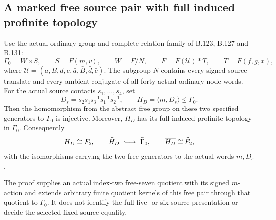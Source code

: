 \subsection*{A marked free source pair with full induced profinite topology}

\label{stmt:B132}
Use the actual ordinary group and complete relation family of B.123,
B.127 and B.131:
\[
 \Gamma_0=W\rtimes S,\qquad S=F(m,v),\qquad
 W=F/N,\qquad F=F(\mathcal U)*T,\qquad T=F(f,g,x),
\]
where
\(\mathcal U=(a,B,d,e,\bar a,\bar B,\bar d,\bar e)\).
The subgroup \(N\) contains every signed source translate and every
ambient conjugate of all forty actual ordinary node words.
For the actual source contacts \(s_1,\ldots,s_4\), set
\begin{equation}\label{eq:B132-source}
 D_s=s_2s_1s_3^{-1}s_1^{-1}s_2^{-1},\qquad
 H_D=\langle m,D_s\rangle\leq\Gamma_0.
\end{equation}
Then the homomorphism from the abstract free group on these two
specified generators to \(\Gamma_0\) is injective. Moreover, \(H_D\)
has its full induced profinite topology in \(\Gamma_0\). Consequently
\begin{equation}\label{eq:B132-completed-pair}
 H_D\cong F_2,\qquad
 \widehat H_D\ \lhook\joinrel\longrightarrow\ \widehat\Gamma_0,
 \qquad
 \overline{H_D}\cong\widehat F_2,
\end{equation}
with the isomorphisms carrying the two free generators to the actual
words \(m,D_s\).

The proof supplies an actual index-two free-seven quotient with its
signed \(m\)-action and extends arbitrary finite quotient kernels of
this free pair through that quotient to \(\Gamma_0\).
It does not identify the full five- or six-source presentation or
decide the selected fixed-source equality.

